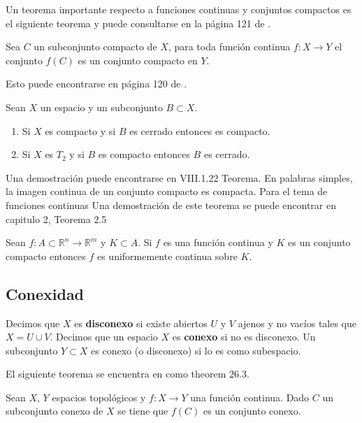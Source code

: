 Un teorema importante respecto a funciones continuas y conjuntos compactos es el siguiente teorema y puede consultarse en la  página 121 de \cite{top_willd}.
 
\begin{te}
Sea $C$ un subconjunto compacto de $X$, para toda función continua $f:X \to Y$ el conjunto $f(C)$ es un conjunto compacto en $Y$.
\end{te}


Esto puede encontrarse en página 120 de \cite{top_willd}. 

\begin{te} 
Sean $X$ un espacio y un subconjunto $B \subset X$. 

	\begin{enumerate}
	\item Si $X$ es compacto y si $B$ es cerrado entonces es compacto. 
	\item Si $X$ es $T_2$ y si $B$ es compacto entonces $B$ es cerrado. 
	\end{enumerate}
	
\end{te}

Una demostración puede encontrarse en \cite{top_prieto} VIII.1.22 Teorema. En palabras simples, la imagen continua de un conjunto compacto es compacta. Para el tema de funciones continuas Una demostración de este teorema se puede encontrar en capitulo 2, Teorema 2.5

\begin{te}
 Sean $f:A \subset \mathbb{R}^n \to \mathbb{R}^m$ y $K \subset A $. Si $f$ es una función continua y $K$ es un conjunto compacto entonces $f$ es uniformemente continua sobre $K$.
\end{te}

\subsection*{Conexidad}
 Decimos que $X$ es \textbf{disconexo} si existe abiertos $U$ y $V$ ajenos y no vacíos tales que $X = U \cup V$. Decimos que un espacio $X$ es \textbf{conexo} si no es disconexo. Un subconjunto $Y \subset X$ es conexo (o disconexo) si lo es como subespacio.

El siguiente teorema se encuentra en \cite{top_willd} como theorem 26.3.

\begin{te}
Sean $X$, $Y$ espacios topológicos y $f:X \to Y$ una función continua. Dado $C$ un subconjunto conexo de $X$ se tiene que $f(C)$ es un conjunto conexo.
\end{te}


